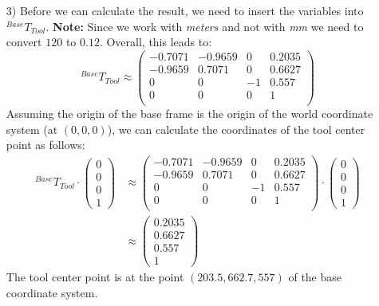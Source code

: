 \documentclass[a4paper,11pt]{article}
\begin{document}
\begin {enumerate}
\begin{enumerate}
        \item[3)] Before we can calculate the result, we need to insert the variables into ${^{Base}T_{Tool}}$. \textbf{Note:} Since we work with \textit{meters} and not with \textit{mm} we need to convert $120$ to $0.12$. Overall, this leads to:
        $${^{Base}T_{Tool}} \approx \begin{pmatrix}
        	-0.7071 & -0.9659 & 0 & 0.2035\\
        	-0.9659 & 0.7071 & 0 & 0.6627\\
        	0 & 0 & -1 & 0.557\\
        	0 & 0 & 0 & 1 \\
        \end{pmatrix}$$
        Assuming the origin of the base frame is the origin of the world coordinate system (at $(0,0,0)$), we can calculate the coordinates of the tool center point as follows:
        \begin{align*}
        	{^{Base}T_{Tool}} \cdot \begin{pmatrix}
        		0\\0\\0\\1
        	\end{pmatrix} &\approx \begin{pmatrix}
        	-0.7071 & -0.9659 & 0 & 0.2035\\
        	-0.9659 & 0.7071 & 0 & 0.6627\\
        	0 & 0 & -1 & 0.557\\
        	0 & 0 & 0 & 1 \\
        \end{pmatrix} \cdot \begin{pmatrix}
        		0\\0\\0\\1
        	\end{pmatrix}\\
        &\approx \begin{pmatrix}
        		0.2035\\0.6627\\0.557\\1
        	\end{pmatrix}
        \end{align*}
        The tool center point is at the point $(203.5, 662.7, 557)$ of the base coordinate system.
        
        
    \end{enumerate}

\end {enumerate}
\end{document}
